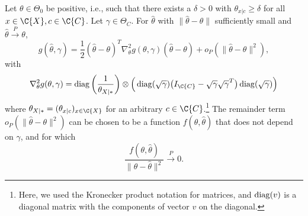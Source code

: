 \begin{Lem}\label{lem:g_derivatives_H0}
  Let $\theta \in \Theta_0$ be positive, i.e., such that there exists a $\delta > 0$ with $\theta_{x|c} \ge \delta$ for all $x \in \C{X}, c \in \C{C}$.
  Let $\gamma \in \Theta_C$.
  For $\hat\theta$ with $\lVert \hat\theta - \theta \rVert$ sufficiently small and $\hat\theta \stackrel{P}{\to} \theta$,
  \begin{equation}
    g(\hat\theta, \gamma) = \frac{1}{2} (\hat\theta - \theta)^T \nabla^2_\theta g(\theta,\gamma) (\hat\theta - \theta) + o_P(\lVert\hat\theta - \theta\rVert^2),
  \end{equation}
  with
  $$\nabla^2_{\theta} g(\theta,\gamma) 
    = \diag\bigg(\frac{1}{\theta_{X|\ast}}\bigg) \otimes \Big(\diag(\sqrt{\gamma}) \big(I_{\C{C}} - \sqrt{\gamma} \sqrt{\gamma}^T\big)\diag(\sqrt{\gamma})\Big)$$
  where $\theta_{X|\ast} = (\theta_{x|c})_{x\in\C{X}}$ for an arbitrary $c \in \C{C}$.\footnote{Here, we used the Kronecker product notation for matrices, and $\operatorname*{\mathrm{diag}}(v)$ is a diagonal matrix with the components of vector $v$ on the diagonal.}
  The remainder term $o_P(\lVert\hat\theta - \theta\rVert^2)$ can be chosen to be a function $f(\theta,\hat\theta)$ that does not depend on $\gamma$, and for which
  $$\frac{f(\theta,\hat\theta)}{\lVert\theta - \hat\theta\rVert^2} \stackrel{P}{\to} 0.$$
\end{Lem}
